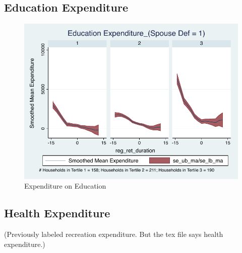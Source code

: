 \documentclass[a4paper]{article}
\begin{document}
\subsection{Education Expenditure}
\begin{table}[h]
	\centering
	
\end{table}

\begin{figure}[h]
	\caption{Expenditure on Education}
	\centering
	\includegraphics[width=1.0\textwidth]{../ConsumptionPostRetirement_by_SpouseDef_Cats/Smoothed/1/spouse_def_total_education_real.pdf}
\end{figure}
\clearpage

\subsection{Health Expenditure}
(Previously labeled recreation expenditure. But the tex file says health expenditure.)

\begin{table}[h]
	\centering
	
\end{table}
\end{document}
